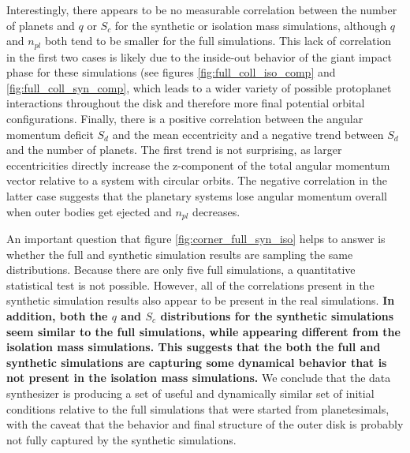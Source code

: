 Interestingly, there appears to be no measurable correlation between the number of planets and $q$ or $S_{c}$ for the synthetic or isolation mass simulations, although $q$ and $n_{pl}$ both tend to be smaller for the full simulations. This lack of correlation in the first two cases is likely due to the inside-out behavior of the giant impact phase for these simulations (see figures \ref{fig:full_coll_iso_comp} and \ref{fig:full_coll_syn_comp}, which leads to a wider variety of possible protoplanet interactions throughout the disk and therefore more final potential orbital configurations. Finally, there is a positive correlation between the angular momentum deficit $S_{d}$ and the mean eccentricity and a negative trend between $S_{d}$ and the number of planets. The first trend is not surprising, as larger eccentricities directly increase the z-component of the total angular momentum vector relative to a system with circular orbits. The negative correlation in the latter case suggests that the planetary systems lose angular momentum overall when outer bodies get ejected and $n_{pl}$ decreases.

An important question that figure  \ref{fig:corner_full_syn_iso} helps to answer is whether the full and synthetic simulation results are sampling the same distributions. Because there are only five full simulations, a quantitative statistical test is not possible. However, all of the correlations present in the synthetic simulation results also appear to be present in the real simulations. \textbf{In addition, both the $q$ and $S_{c}$ distributions for the synthetic simulations seem similar to the full simulations, while appearing different from the isolation mass simulations. This suggests that the both the full and synthetic simulations are capturing some dynamical behavior that is not present in the isolation mass simulations.} We conclude that the data synthesizer is producing a set of useful and dynamically similar set of initial conditions relative to the full simulations that were started from planetesimals, with the caveat that the behavior and final structure of the outer disk is probably not fully captured by the synthetic simulations.

